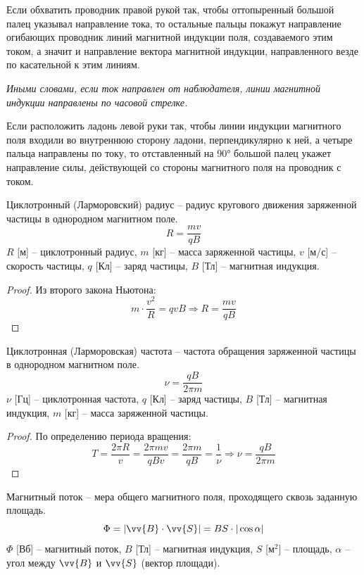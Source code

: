 \documentclass[12pt]{article}
\begin{document}
\begin{law}
    Если обхватить проводник правой рукой так, чтобы оттопыренный большой палец указывал направление тока, то остальные пальцы покажут направление огибающих проводник линий магнитной индукции поля, создаваемого этим током, а значит и направление вектора магнитной индукции, направленного везде по касательной к этим линиям.\bigskip

    \textit{Иными словами, если ток направлен от наблюдателя, линии магнитной индукции направлены по часовой стрелке.}
\end{law}
\begin{law}
    Если расположить ладонь левой руки так, чтобы линии индукции магнитного поля входили во внутреннюю сторону ладони, перпендикулярно к ней, а четыре пальца направлены по току, то отставленный на 90° большой палец укажет направление силы, действующей со стороны магнитного поля на проводник с током.
\end{law}
\begin{definition}
    Циклотронный (Ларморовский) радиус -- радиус кругового движения заряженной частицы в однородном магнитном поле.
    $$R=\frac{mv}{qB}$$
    $R$ [м] -- циклотронный радиус, $m$ [кг] -- масса заряженной частицы, $v$ [м/с] -- скорость частицы, $q$ [Кл] -- заряд частицы, $B$ [Тл] -- магнитная индукция.
\end{definition}
\begin{proof}
    Из второго закона Ньютона:
    $$m\cdot \frac{v^2}{R}=qvB\Longrightarrow R=\frac{mv}{qB}$$ 
\end{proof}
\begin{definition}
    Циклотронная (Ларморовская) частота -- частота обращения заряженной частицы в однородном магнитном поле.
    $$\nu=\frac{qB}{2\pi m}$$
    $\nu$ [Гц] -- циклотронная частота, $q$ [Кл] -- заряд частицы, $B$ [Тл] -- магнитная индукция, $m$ [кг] -- масса заряженной частицы.
\end{definition}
\begin{proof}
    По определению периода вращения:
    $$T=\frac{2\pi R}{v}=\frac{2\pi mv}{qBv}=\frac{2\pi m}{qB}=\frac{1}{\nu}\Longrightarrow \nu=\frac{qB}{2\pi m}$$
\end{proof}
\begin{definition}
    Магнитный поток -- мера общего магнитного поля, проходящего сквозь заданную площадь.
    $$\Phi=|\vv{B}\cdot \vv{S}|=B S\cdot |\cos\alpha|$$
    $\Phi$ [Вб] -- магнитный поток, $B$ [Тл] -- магнитная индукция, $S$ [м$^2$] -- площадь, $\alpha$ -- угол между $\vv{B}$ и $\vv{S}$ (вектор площади).
\end{definition}
\end{document}
